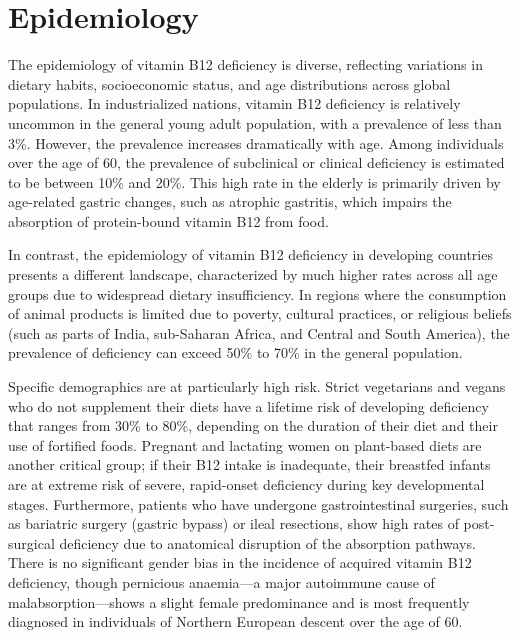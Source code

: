 \section*{Epidemiology}
The epidemiology of vitamin B12 deficiency is diverse, reflecting variations in dietary habits, socioeconomic status, and age distributions across global populations. In industrialized nations, vitamin B12 deficiency is relatively uncommon in the general young adult population, with a prevalence of less than 3\%. However, the prevalence increases dramatically with age. Among individuals over the age of 60, the prevalence of subclinical or clinical deficiency is estimated to be between 10\% and 20\%. This high rate in the elderly is primarily driven by age-related gastric changes, such as atrophic gastritis, which impairs the absorption of protein-bound vitamin B12 from food.

In contrast, the epidemiology of vitamin B12 deficiency in developing countries presents a different landscape, characterized by much higher rates across all age groups due to widespread dietary insufficiency. In regions where the consumption of animal products is limited due to poverty, cultural practices, or religious beliefs (such as parts of India, sub-Saharan Africa, and Central and South America), the prevalence of deficiency can exceed 50\% to 70\% in the general population.

Specific demographics are at particularly high risk. Strict vegetarians and vegans who do not supplement their diets have a lifetime risk of developing deficiency that ranges from 30\% to 80\%, depending on the duration of their diet and their use of fortified foods. Pregnant and lactating women on plant-based diets are another critical group; if their B12 intake is inadequate, their breastfed infants are at extreme risk of severe, rapid-onset deficiency during key developmental stages. Furthermore, patients who have undergone gastrointestinal surgeries, such as bariatric surgery (gastric bypass) or ileal resections, show high rates of post-surgical deficiency due to anatomical disruption of the absorption pathways. There is no significant gender bias in the incidence of acquired vitamin B12 deficiency, though pernicious anaemia---a major autoimmune cause of malabsorption---shows a slight female predominance and is most frequently diagnosed in individuals of Northern European descent over the age of 60.

